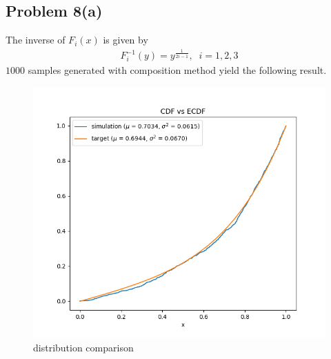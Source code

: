 \documentclass{article}
\begin{document}
\subsection*{Problem 8(a)}
The inverse of $F_{i}(x)$ is given by
\begin{align*}
  F_{i}^{-1}(y)=y^{\frac{1}{2i-1}}, \;\; i=1,2,3
\end{align*}
$1000$ samples generated with composition method yield the following result.
\begin{figure}[h!]
    \centering
    \includegraphics[width=\linewidth]{../images/p8a_1000.png}
    \caption{distribution comparison}
\end{figure}
\newpage
\end{document}
